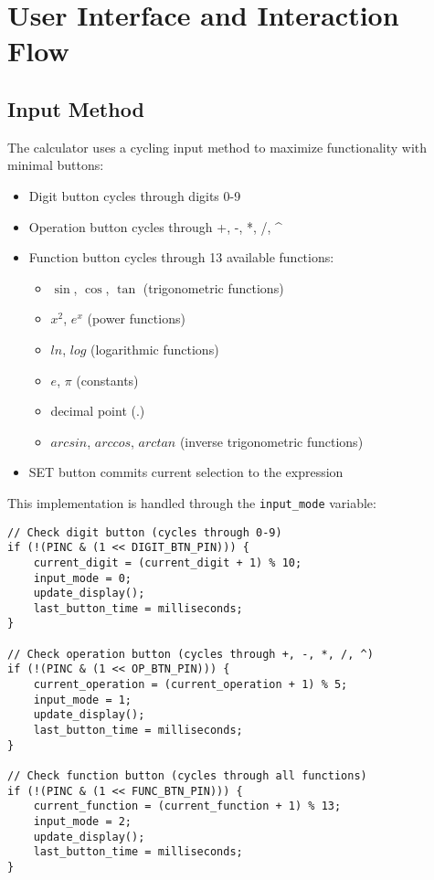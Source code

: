 \documentclass[12pt,a4paper]{article}
\begin{document}
\section{User Interface and Interaction Flow}

\subsection{Input Method}

The calculator uses a cycling input method to maximize functionality with minimal buttons:

\begin{itemize}
    \item Digit button cycles through digits 0-9
    \item Operation button cycles through +, -, *, /, \^{}
    \item Function button cycles through 13 available functions:
    \begin{itemize}
        \item $\sin$, $\cos$, $\tan$ (trigonometric functions)
        \item $x^2$, $e^x$ (power functions)
        \item $ln$, $log$ (logarithmic functions)
        \item $e$, $\pi$ (constants)
        \item decimal point ($.$)
        \item $arcsin$, $arccos$, $arctan$ (inverse trigonometric functions)
    \end{itemize}
    \item SET button commits current selection to the expression
\end{itemize}

This implementation is handled through the \texttt{input\_mode} variable:

\begin{lstlisting}
// Check digit button (cycles through 0-9)
if (!(PINC & (1 << DIGIT_BTN_PIN))) {
    current_digit = (current_digit + 1) % 10;
    input_mode = 0;
    update_display();
    last_button_time = milliseconds;
}

// Check operation button (cycles through +, -, *, /, ^)
if (!(PINC & (1 << OP_BTN_PIN))) {
    current_operation = (current_operation + 1) % 5;
    input_mode = 1;
    update_display();
    last_button_time = milliseconds;
}

// Check function button (cycles through all functions)
if (!(PINC & (1 << FUNC_BTN_PIN))) {
    current_function = (current_function + 1) % 13;
    input_mode = 2;
    update_display();
    last_button_time = milliseconds;
}
\end{lstlisting}
\end{document}
